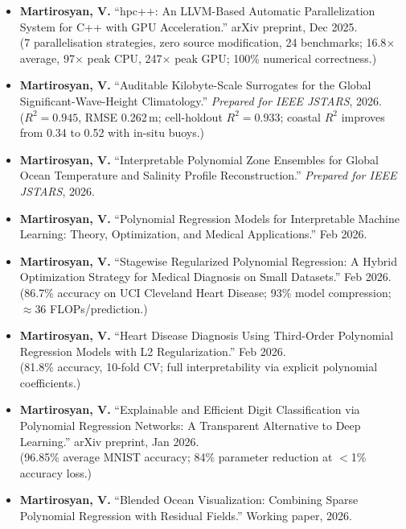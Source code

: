 \documentclass[a4paper,12pt]{article}
\newcommand{\pubgroup}[1]{%
  \vspace{10pt}%
  \noindent{\normalsize\bfseries\color{primary}#1}\par\vspace{-4pt}%
  \noindent{\color{primary}\rule{\linewidth}{0.5pt}}\par\vspace{3pt}%
}
\begin{document}
\pubgroup{Preprints \& Prepared Manuscripts}
\begin{itemize}[leftmargin=*, itemsep=4pt, topsep=3pt]
  \item \textbf{Martirosyan, V.} ``hpc++: An LLVM-Based Automatic Parallelization System for C++
        with GPU Acceleration.'' arXiv preprint, Dec 2025.\\
        {\small(7 parallelisation strategies, zero source modification, 24 benchmarks; 16.8$\times$
        average, 97$\times$ peak CPU, 247$\times$ peak GPU; 100\% numerical correctness.)}
  \item \textbf{Martirosyan, V.} ``Auditable Kilobyte-Scale Surrogates for the Global
        Significant-Wave-Height Climatology.'' \textit{Prepared for IEEE JSTARS}, 2026.\\
        {\small($R^2 = 0.945$, RMSE 0.262\,m; cell-holdout $R^2 = 0.933$; coastal $R^2$ improves
        from 0.34 to 0.52 with in-situ buoys.)}
  \item \textbf{Martirosyan, V.} ``Interpretable Polynomial Zone Ensembles for Global Ocean
        Temperature and Salinity Profile Reconstruction.'' \textit{Prepared for IEEE JSTARS}, 2026.
  \item \textbf{Martirosyan, V.} ``Polynomial Regression Models for Interpretable Machine
        Learning: Theory, Optimization, and Medical Applications.'' Feb 2026.
  \item \textbf{Martirosyan, V.} ``Stagewise Regularized Polynomial Regression: A Hybrid
        Optimization Strategy for Medical Diagnosis on Small Datasets.'' Feb 2026.\\
        {\small(86.7\% accuracy on UCI Cleveland Heart Disease; 93\% model compression;
        $\approx$36 FLOPs/prediction.)}
  \item \textbf{Martirosyan, V.} ``Heart Disease Diagnosis Using Third-Order Polynomial
        Regression Models with L2 Regularization.'' Feb 2026.\\
        {\small(81.8\% accuracy, 10-fold CV; full interpretability via explicit polynomial
        coefficients.)}
  \item \textbf{Martirosyan, V.} ``Explainable and Efficient Digit Classification via Polynomial
        Regression Networks: A Transparent Alternative to Deep Learning.'' arXiv preprint, Jan
        2026.\\
        {\small(96.85\% average MNIST accuracy; 84\% parameter reduction at $<$1\% accuracy loss.)}
  \item \textbf{Martirosyan, V.} ``Blended Ocean Visualization: Combining Sparse Polynomial
        Regression with Residual Fields.'' Working paper, 2026.
\end{itemize}
\end{document}
